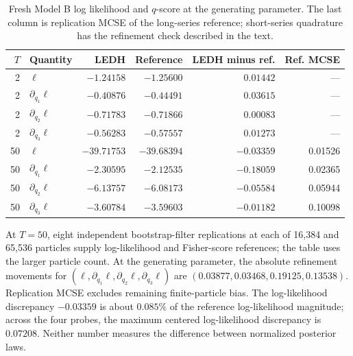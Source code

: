 \begin{table}[htbp]
\centering\small
\caption{Fresh Model B log likelihood and $q$-score at the generating
parameter.  The last column is replication MCSE of the long-series reference;
short-series quadrature has the refinement check described in the text.}
\label{tab:bf-structural-tanh-reference}
\begin{tabular}{rlrrrr}
\toprule
$T$ & Quantity & LEDH & Reference & LEDH minus ref. & Ref. MCSE\\
\midrule
2 & $\ell$ & $-1.24158$ & $-1.25600$ & $ 0.01442$ & ---\\
2 & $\partial_{q_1}\ell$ & $-0.40876$ & $-0.44491$ & $ 0.03615$ & ---\\
2 & $\partial_{q_2}\ell$ & $-0.71783$ & $-0.71866$ & $ 0.00083$ & ---\\
2 & $\partial_{q_3}\ell$ & $-0.56283$ & $-0.57557$ & $ 0.01273$ & ---\\
\midrule
50 & $\ell$ & $-39.71753$ & $-39.68394$ & $-0.03359$ & 0.01526\\
50 & $\partial_{q_1}\ell$ & $-2.30595$ & $-2.12535$ & $-0.18059$ & 0.02365\\
50 & $\partial_{q_2}\ell$ & $-6.13757$ & $-6.08173$ & $-0.05584$ & 0.05944\\
50 & $\partial_{q_3}\ell$ & $-3.60784$ & $-3.59603$ & $-0.01182$ & 0.10098\\
\bottomrule
\end{tabular}
\end{table}

At $T=50$, eight independent bootstrap-filter replications at each of
16,384 and 65,536 particles supply log-likelihood and Fisher-score references;
the table uses the larger particle count.  At the generating parameter,
the absolute refinement movements for $(\ell,\partial_{q_1}\ell,
\partial_{q_2}\ell,\partial_{q_3}\ell)$ are
$(0.03877,0.03468,0.19125,0.13538)$.  Replication MCSE excludes remaining
finite-particle bias.  The log-likelihood discrepancy $-0.03359$ is about
$0.085\%$ of the reference log-likelihood magnitude; across the four probes,
the maximum centered log-likelihood discrepancy is $0.07208$.
Neither number measures the difference between normalized posterior laws.

